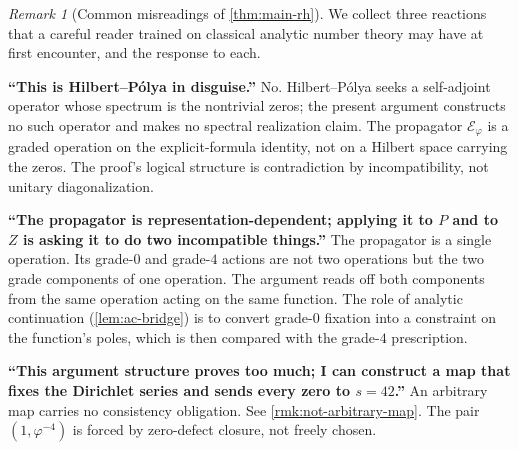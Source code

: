 \documentclass[11pt,a4paper]{article}
\theoremstyle{plain}
\theoremstyle{definition}
\theoremstyle{remark}
\newtheorem{remark}[theorem]{Remark}
\numberwithin{equation}{section}
\providecommand{\vp}{\varphi}
\providecommand{\EF}{\mathcal{E}}
\begin{document}
\begin{remark}[Common misreadings of \cref{thm:main-rh}]
\label{rmk:common-misreadings}
We collect three reactions that a careful reader trained on
classical analytic number theory may have at first encounter, and
the response to each.

\smallskip\textbf{``This is Hilbert--P\'olya in disguise.''}\quad
No.  Hilbert--P\'olya seeks a self-adjoint operator whose
spectrum is the nontrivial zeros; the present argument constructs
no such operator and makes no spectral realization claim.  The
propagator $\EF_\vp$ is a graded operation on the explicit-formula
identity, not on a Hilbert space carrying the zeros.  The proof's
logical structure is contradiction by incompatibility, not
unitary diagonalization.

\smallskip\textbf{``The propagator is representation-dependent;
applying it to $P$ and to $Z$ is asking it to do two
incompatible things.''}\quad
The propagator is a single operation.  Its grade-$0$ and
grade-$4$ actions are not two operations but the two grade
components of one operation.  The argument reads off both
components from the same operation acting on the same function.
The role of analytic continuation (\cref{lem:ac-bridge}) is to
convert grade-$0$ fixation into a constraint on the function's
poles, which is then compared with the grade-$4$ prescription.

\smallskip\textbf{``This argument structure proves too much; I can
construct a map that fixes the Dirichlet series and sends every
zero to $s = 42$.''}\quad
An arbitrary map carries no consistency obligation.  See
\cref{rmk:not-arbitrary-map}.  The pair $(1, \vp^{-4})$ is forced
by zero-defect closure, not freely chosen.
\end{remark}
\end{document}
